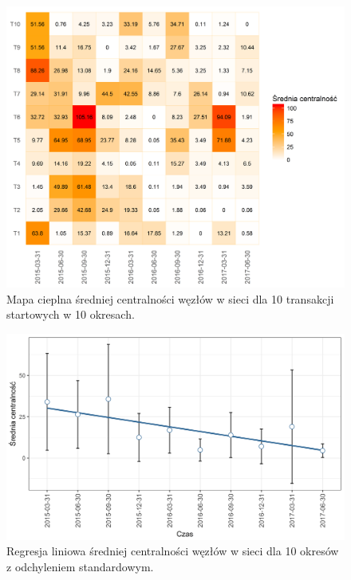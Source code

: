 \documentclass[12pt, twoside, final, openany]{mgr}
\newcommand{\chartsWidth}{0.8}
\begin{document}
\begin{figure}[H]
\centering
   \includegraphics[width=\chartsWidth\linewidth]{pictures/srednia_centralnosc/srednia_centralnosc_hm.png}
   \caption{Mapa cieplna średniej centralności węzłów w sieci dla 10 transakcji startowych w 10 okresach.}
   \label{fig:sc1} 
\end{figure}
\begin{figure}[H]
\centering
   \includegraphics[width=\chartsWidth\linewidth]{pictures/srednia_centralnosc/srednia_centralnosc_sda.png}
   \caption{Regresja liniowa średniej centralności węzłów w sieci dla 10 okresów z odchyleniem standardowym.}
   \label{fig:sc2}
\end{figure}
\end{document}
